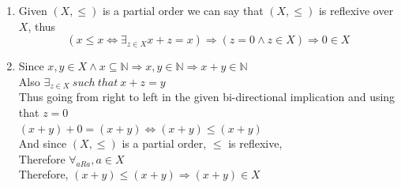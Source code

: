 \documentclass[12pt]{article}
\newcommand{\N}{\mathbb{N}}
\newenvironment{solution}[2][Solution]{ \begin{trivlist}
\item[\hskip \labelsep {\bfseries #1}]}{\end{trivlist}}
\begin{document}
\begin{solution}{7}
\item[]
\begin{enumerate}[label=\alph*)]
    \item Given $(X,\le)$ is a partial order we can say that $(X,\le)$ is reflexive over $X$,
    thus $$(x \le x \Leftrightarrow \exists_{z \in X} x+z=x) \Rightarrow (z = 0 \wedge z \in X) \Rightarrow 0 \in X$$
    \item Since $x,y \in X \wedge x \subseteq \N \Rightarrow x,y \in \N \Rightarrow x+y \in \N$\\
    Also $\exists_{z \in X}\ such\  that\ x + z = y$\\
    Thus going from right to left in the given bi-directional implication and using that $z=0$ \\
    $(x+y) + 0 = (x+y) \Leftrightarrow (x+y) \le (x+y)$\\ And since $(X, \le)$ is a partial order, $\le$ is reflexive,\\
    Therefore $\forall_{aRa}, a \in X$\\
    Therefore, $(x+y) \le (x+y) \Rightarrow (x+y) \in X$
\end{enumerate}
\end{solution}

\vskip 0.5in
\end{document}
